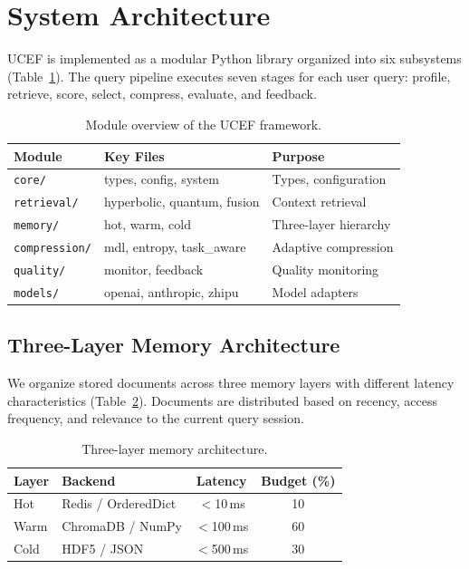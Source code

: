 \documentclass[11pt,a4paper]{article}
\newcommand{\ucef}{\textsf{UCEF}}
\begin{document}
\section{System Architecture}
\label{sec:architecture}

\ucef{} is implemented as a modular Python library organized into six
subsystems (Table~\ref{tab:modules}).  The query pipeline executes seven
stages for each user query: profile, retrieve, score, select, compress,
evaluate, and feedback.

\begin{table}[t]
\centering
\caption{Module overview of the \ucef{} framework.}
\label{tab:modules}
\small
\begin{tabular}{@{}lll@{}}
\toprule
Module & Key Files & Purpose \\
\midrule
\texttt{core/} & types, config, system & Types, configuration \\
\texttt{retrieval/} & hyperbolic, quantum, fusion & Context retrieval \\
\texttt{memory/} & hot, warm, cold & Three-layer hierarchy \\
\texttt{compression/} & mdl, entropy, task\_aware & Adaptive compression \\
\texttt{quality/} & monitor, feedback & Quality monitoring \\
\texttt{models/} & openai, anthropic, zhipu & Model adapters \\
\bottomrule
\end{tabular}
\end{table}

\subsection{Three-Layer Memory Architecture}

We organize stored documents across three memory layers with different
latency characteristics (Table~\ref{tab:memory}).  Documents are distributed
based on recency, access frequency, and relevance to the current query
session.

\begin{table}[t]
\centering
\caption{Three-layer memory architecture.}
\label{tab:memory}
\small
\begin{tabular}{@{}llcc@{}}
\toprule
Layer & Backend & Latency & Budget (\%) \\
\midrule
Hot   & Redis / OrderedDict & $<$10\,ms  & 10 \\
Warm  & ChromaDB / NumPy    & $<$100\,ms & 60 \\
Cold  & HDF5 / JSON         & $<$500\,ms & 30 \\
\bottomrule
\end{tabular}
\end{table}
\end{document}
